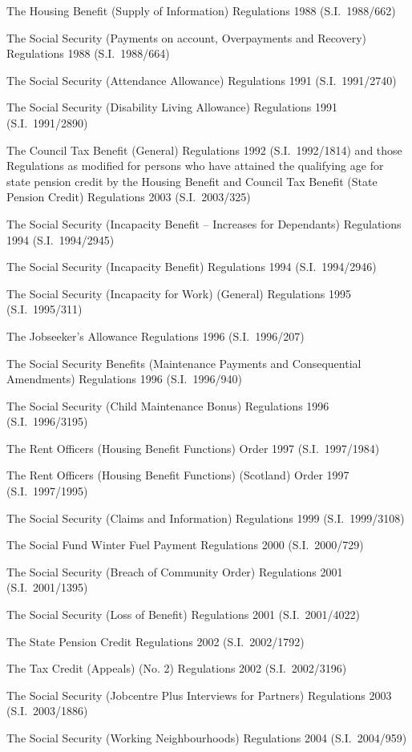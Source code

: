 \documentclass[12pt,a4paper]{article}
\begin{document}
\begin{enumerate}
    The Housing Benefit (Supply of Information) Regulations 1988 (S.I.\ 1988/\hspace{0pt}662)

    The Social Security (Payments on account, Overpayments and Recovery) Regulations 1988 (S.I.\ 1988/664)

    The Social Security (Attendance Allowance) Regulations 1991 (S.I.\ 1991/\hspace{0pt}2740)

    The Social Security (Disability Living Allowance) Regulations 1991 (S.I.\ 1991/2890)

    The Council Tax Benefit (General) Regulations 1992 (S.I.\ 1992/1814) and those Regulations as modified for persons who have attained the qualifying age for state pension credit by the Housing Benefit and Council Tax Benefit (State Pension Credit) Regulations 2003 (S.I.\ 2003/325)

    The Social Security (Incapacity Benefit – Increases for Dependants) Regulations 1994 (S.I.\ 1994/2945)

    The Social Security (Incapacity Benefit) Regulations 1994 (S.I.\ 1994/2946)

    The Social Security (Incapacity for Work) (General) Regulations 1995 (S.I.\ 1995/311)

    The Jobseeker’s Allowance Regulations 1996 (S.I.\ 1996/207)

    The Social Security Benefits (Maintenance Payments and Consequential Amendments) Regulations 1996 (S.I.\ 1996/940)

    The Social Security (Child Maintenance Bonus) Regulations 1996 (S.I.\ 1996/3195)

    The Rent Officers (Housing Benefit Functions) Order 1997 (S.I.\ 1997/1984)

    The Rent Officers (Housing Benefit Functions) (Scotland) Order 1997 (S.I.\ 1997/1995)

    The Social Security (Claims and Information) Regulations 1999 (S.I.\ 1999/\hspace{0pt}3108)

    The Social Fund Winter Fuel Payment Regulations 2000 (S.I.\ 2000/729)

    The Social Security (Breach of Community Order) Regulations 2001 (S.I.\ 2001/1395)

    The Social Security (Loss of Benefit) Regulations 2001 (S.I.\ 2001/4022)

    The State Pension Credit Regulations 2002 (S.I.\ 2002/1792)

    The Tax Credit (Appeals) (No. 2) Regulations 2002 (S.I.\ 2002/3196)

    The Social Security (Jobcentre Plus Interviews for Partners) Regulations 2003 (S.I.\ 2003/1886)

    The Social Security (Working Neighbourhoods) Regulations 2004 (S.I.\ 2004/\hspace{0pt}959) 
\end{enumerate}
\end{document}
